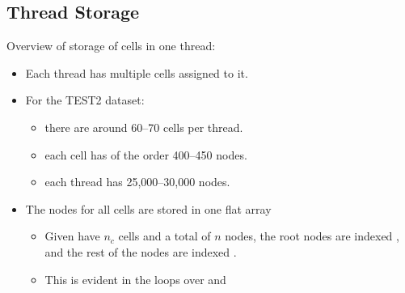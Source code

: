 \subsection{Thread Storage}
Overview of storage of cells in one thread:
\begin{itemize}
\item
    Each thread has multiple cells assigned to it.
\item
    For the TEST2 dataset:
    \begin{itemize}
    \item
        there are around 60--70 cells per thread.
    \item
        each cell has of the order 400--450 nodes.
    \item
        each thread has 25,000--30,000 nodes.
    \end{itemize}
\item
    The nodes for all cells are stored in one flat array
    \begin{itemize}
    \item
        Given have $n_c$ cells and a total of $n$ nodes, the root nodes are indexed \lst{[1:n_c]}, and the rest of the nodes are indexed \lst{[n_c+1:n]}.
    \item
        This is evident in the loops over  and 
    \end{itemize}
\end{itemize}

